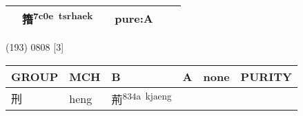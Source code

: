 \documentclass[14pt,a4paper]{scrartcl}
\begin{document}
\begin{longtable}[c]{@{}llllll@{}}
\begin{minipage}[t]{0.14\columnwidth}
\strut\end{minipage} &
\begin{minipage}[t]{0.14\columnwidth}\raggedright\strut
簎\textsuperscript{7c0e~tsrhaek}
\strut\end{minipage} &
\begin{minipage}[t]{0.14\columnwidth}\raggedright\strut
\strut\end{minipage} &
\begin{minipage}[t]{0.14\columnwidth}\raggedright\strut
pure:A
\strut\end{minipage}\tabularnewline
\bottomrule
\end{longtable}

(193) 0808 {[}3{]}

\begin{longtable}[c]{@{}llllll@{}}
\toprule
\begin{minipage}[b]{0.14\columnwidth}\raggedright\strut
GROUP
\strut\end{minipage} &
\begin{minipage}[b]{0.14\columnwidth}\raggedright\strut
MCH
\strut\end{minipage} &
\begin{minipage}[b]{0.14\columnwidth}\raggedright\strut
B
\strut\end{minipage} &
\begin{minipage}[b]{0.14\columnwidth}\raggedright\strut
A
\strut\end{minipage} &
\begin{minipage}[b]{0.14\columnwidth}\raggedright\strut
none
\strut\end{minipage} &
\begin{minipage}[b]{0.14\columnwidth}\raggedright\strut
PURITY
\strut\end{minipage}\tabularnewline
\midrule
\endhead
\begin{minipage}[t]{0.14\columnwidth}\raggedright\strut
刑
\strut\end{minipage} &
\begin{minipage}[t]{0.14\columnwidth}\raggedright\strut
heng
\strut\end{minipage} &
\begin{minipage}[t]{0.14\columnwidth}\raggedright\strut
荊\textsuperscript{834a~kjaeng}
\strut\end{minipage} &
\begin{minipage}[t]{0.14\columnwidth}\raggedright\strut
\strut\end{minipage} &
\begin{minipage}[t]{0.14\columnwidth}\raggedright\strut

\end{minipage}
\end{longtable}
\end{document}
